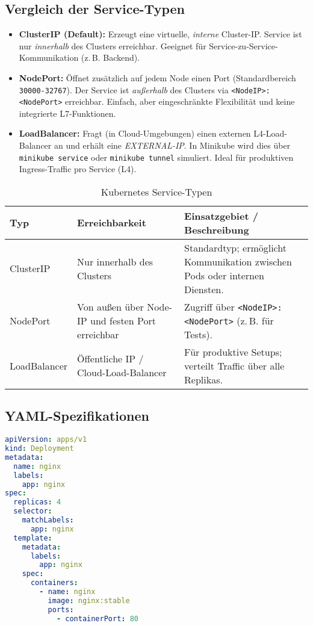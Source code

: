 \documentclass[BMR,Seminar,ngerman,IEEE]{twbook}
\begin{document}
\subsection{Vergleich der Service-Typen}
\begin{itemize}
  \item \textbf{ClusterIP (Default):} Erzeugt eine virtuelle, \emph{interne} Cluster-IP. Service ist nur \emph{innerhalb} des Clusters erreichbar. Geeignet für Service-zu-Service-Kommunikation (z.\,B. Backend).
  \item \textbf{NodePort:} Öffnet zusätzlich auf jedem Node einen Port (Standardbereich \texttt{30000{-}32767}). Der Service ist \emph{außerhalb} des Clusters via \texttt{<NodeIP>:<NodePort>} erreichbar. Einfach, aber eingeschränkte Flexibilität und keine integrierte L7-Funktionen.
  \item \textbf{LoadBalancer:} Fragt (in Cloud-Umgebungen) einen externen L4-Load-Balancer an und erhält eine \emph{EXTERNAL-IP}. In Minikube wird dies über \texttt{minikube service} oder \texttt{minikube tunnel} simuliert. Ideal für produktiven Ingress-Traffic pro Service (L4).
\end{itemize}
\begin{table*}[t]
\centering
\begin{tabularx}{\textwidth}{@{}p{2.8cm}p{5cm}X@{}}
\toprule
\textbf{Typ} & \textbf{Erreichbarkeit} & \textbf{Einsatzgebiet / Beschreibung} \\
\midrule
ClusterIP & Nur innerhalb des Clusters & Standardtyp; ermöglicht Kommunikation zwischen Pods oder internen Diensten. \\
NodePort & Von außen über Node-IP und festen Port erreichbar & Zugriff über \texttt{\textless NodeIP\textgreater:\textless NodePort\textgreater} (z.\,B. für Tests). \\
LoadBalancer & Öffentliche IP / Cloud-Load-Balancer & Für produktive Setups; verteilt Traffic über alle Replikas. \\
\bottomrule
\end{tabularx}
\caption{Kubernetes Service-Typen}
\end{table*}
\FloatBarrier

\subsection{YAML-Spezifikationen}
\begin{lstlisting}[language=yaml,caption={Deployment YAML – nginx}]
apiVersion: apps/v1
kind: Deployment
metadata:
  name: nginx
  labels:
    app: nginx
spec:
  replicas: 4
  selector:
    matchLabels:
      app: nginx
  template:
    metadata:
      labels:
        app: nginx
    spec:
      containers:
        - name: nginx
          image: nginx:stable
          ports:
            - containerPort: 80
\end{lstlisting}
\end{document}
